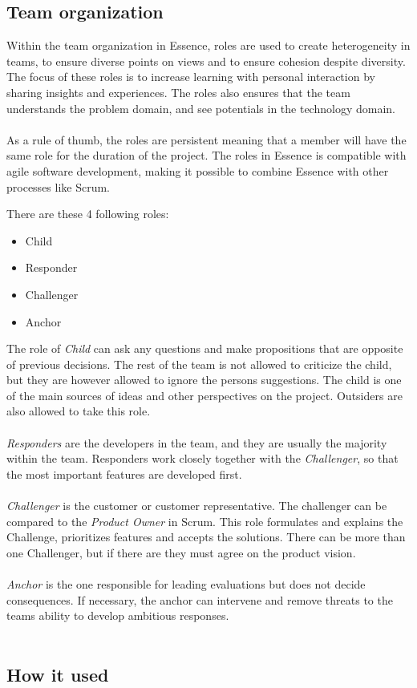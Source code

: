 \subsection{Team organization}
Within the team organization in Essence, roles are used to create heterogeneity in teams, to ensure diverse points on views and to ensure cohesion despite diversity.
The focus of these roles is to increase learning with personal interaction by sharing insights and experiences.
The roles also ensures that the team understands the problem domain, and see potentials in the technology domain.
\\\\
As a rule of thumb, the roles are  persistent meaning that a member will have the same role for the duration of the project.
The roles in Essence is compatible with agile software development, making it possible to combine Essence with other processes like Scrum.

There are these 4 following roles:
\begin{itemize}
    \item Child
    \item Responder
    \item Challenger
    \item Anchor
\end{itemize}
The role of \textit{Child} can ask any questions and make propositions that are opposite of previous decisions.
The rest of the team is not allowed to criticize the child, but they are however allowed to ignore the persons suggestions.
The child is one of the main sources of ideas and other perspectives on the project.
Outsiders are also allowed to take this role.
\\\\
\textit{Responders} are the developers in the team, and they are usually the majority within the team.
Responders work closely together with the \textit{Challenger}, so that the most important features are developed first.
\\\\
\textit{Challenger} is the customer or customer representative. 
The challenger can be compared to the \textit{Product Owner} in Scrum.
This role formulates and explains the Challenge, prioritizes features and accepts the solutions.
There can be more than one Challenger, but if there are they must agree on the product vision.
\\\\
\textit{Anchor} is the one responsible for leading evaluations but does not decide consequences.
If necessary, the anchor can intervene and remove threats to the teams ability to develop ambitious responses. 
\\\\
\subsection{How it used}

